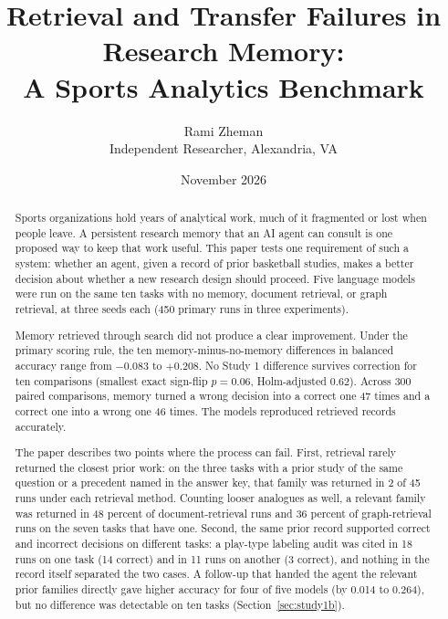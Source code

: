 \documentclass[11pt]{article}
\title{Retrieval and Transfer Failures in Research Memory:\\
A Sports Analytics Benchmark}
\author{Rami Zheman \\ Independent Researcher, Alexandria, VA}
\date{November 2026}
\begin{document}
\maketitle

\begin{abstract}
Sports organizations hold years of analytical work, much of it fragmented or lost when people leave. A persistent research memory that an AI agent can consult is one proposed way to keep that work useful. This paper tests one requirement of such a system: whether an agent, given a record of prior basketball studies, makes a better decision about whether a new research design should proceed. Five language models were run on the same ten tasks with no memory, document retrieval, or graph retrieval, at three seeds each (450 primary runs in three experiments).

Memory retrieved through search did not produce a clear improvement. Under the primary scoring rule, the ten memory-minus-no-memory differences in balanced accuracy range from $-0.083$ to $+0.208$. No Study 1 difference survives correction for ten comparisons (smallest exact sign-flip $p = 0.06$, Holm-adjusted $0.62$). Across 300 paired comparisons, memory turned a wrong decision into a correct one 47 times and a correct one into a wrong one 46 times. The models reproduced retrieved records accurately.

The paper describes two points where the process can fail. First, retrieval rarely returned the closest prior work: on the three tasks with a prior study of the same question or a precedent named in the answer key, that family was returned in 2 of 45 runs under each retrieval method. Counting looser analogues as well, a relevant family was returned in 48 percent of document-retrieval runs and 36 percent of graph-retrieval runs on the seven tasks that have one. Second, the same prior record supported correct and incorrect decisions on different tasks: a play-type labeling audit was cited in 18 runs on one task (14 correct) and in 11 runs on another (3 correct), and nothing in the record itself separated the two cases. A follow-up that handed the agent the relevant prior families directly gave higher accuracy for four of five models (by 0.014 to 0.264), but no difference was detectable on ten tasks (Section~\ref{sec:study1b}).
\end{abstract}
\end{document}
